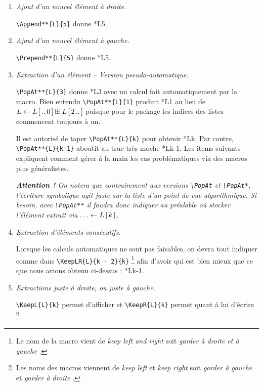 \documentclass[12pt,a4paper]{article}
\theoremstyle{definition}
\newcommand\myquote[1]{{\itshape \og #1 \fg}}
\begin{document}
\begin{enumerate}
	\item \textit{Ajout d'un nouvel élément à droite.}

	      \verb+\Append**{L}{5}+ donne \Append**{L}{5}.


	\item \textit{Ajout d'un nouvel élément à gauche.}

	      \verb+\Prepend**{L}{5}+ donne \Prepend**{L}{5}.


	\item \textit{Extraction d'un élément -- Version pseudo-automatique.}

	      \verb+\PopAt**{L}{3}+ donne \PopAt**{L}{3} avec un calcul fait automatiquement par la macro.
	      Bien entendu \verb+\PopAt**{L}{1}+ produit \PopAt**{L}{1} au lieu de $L \Store \ListUntil{L}{0} \AddList \ListFrom{L}{2}$ puisque pour le package les indices des listes commencent toujours à un.
	      
	      Il est autorisé de taper \verb+\PopAt**{L}{k}+ pour obtenir \PopAt**{L}{k}. Par contre, \verb+\PopAt**{L}{k-1}+ aboutit au truc très moche \PopAt**{L}{k-1}. 
	      Les items suivants expliquent comment gérer à la main les cas problématiques via des macros plus généralistes.

	      \smallskip

	      \emph{\textbf{Attention !} On notera que contrairement aux versions \emph{\texttt{\textbackslash{}PopAt}} et \emph{\texttt{\textbackslash{}PopAt*}}, l'écriture symbolique agit juste sur la liste d'un point de vue algorithmique. Si besoin, avec \emph{\texttt{\textbackslash{}PopAt**}} il faudra donc indiquer au préalable où stocker l'élément extrait via $\dots \Store \ListElt{L}{k}$.}


	\item \textit{Extraction d'éléments consécutifs.}

	      Lorsque les calculs automatiques ne sont pas faisables, on devra tout indiquer comme dans \verb+\KeepLR{L}{k - 2}{k}+
	      \footnote{
	      	Le nom de la macro vient de \myquote{keep left and right} soit \myquote{garder à droite et à gauche}.
		  }
		  afin d'avoir  qui est bien mieux que ce que nous avions obtenu ci-dessus : \PopAt**{L}{k-1}.


	\item \textit{Extractions juste à droite, ou juste à gauche.}

	      \verb+\KeepL{L}{k}+ permet d'afficher  et \verb++ permet quant à lui d'écrire \KeepR{L}{k}
	      \footnote{
	      	Les noms des macros viennent de \myquote{keep left} et \myquote{keep right} soit \myquote{garder à gauche} et \myquote{garder à droite}.
		  }.
\end{enumerate}
\end{document}
